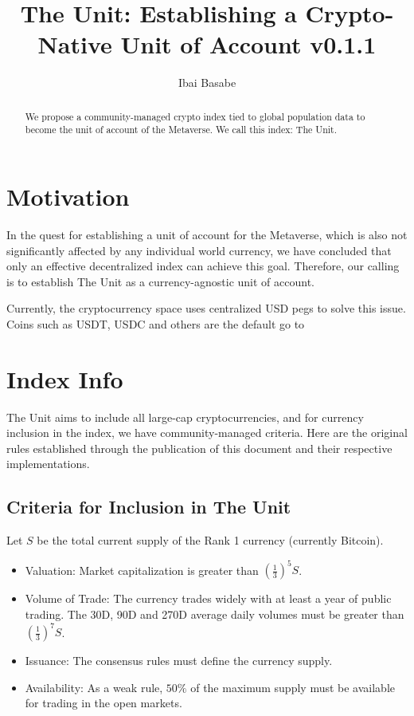 \documentclass[12pt]{article}
\title{The Unit: Establishing a Crypto-Native Unit of Account v0.1.1}
\author{Ibai Basabe}
\begin{document}
\pagecolor{yellow!15!}

\date{}

\maketitle


\begin{abstract}
We propose a community-managed crypto index tied to global population data to become the unit of account of the Metaverse. We call this index: The Unit. 
\end{abstract}


\tableofcontents
\newpage

\section{Motivation}

In the quest for establishing a unit of account for the Metaverse, which is also not significantly affected by any individual world currency, we have concluded that only an effective decentralized index can achieve this goal. Therefore, our calling is to establish The Unit as a currency-agnostic unit of account. 

Currently, the cryptocurrency space uses centralized USD pegs to solve this issue. Coins such as USDT, USDC and others are the default go to  

\section{Index Info}

The Unit aims to include all large-cap cryptocurrencies, and for currency inclusion in the index, we have community-managed criteria. Here are the original rules established through the publication of this document and their respective implementations.

\subsection{Criteria for Inclusion in The Unit}

Let $S$ be the total current supply of the Rank 1 currency (currently Bitcoin).

\begin{itemize}

\item Valuation: Market capitalization is greater than $\left(\frac{1}{3}\right)^5 S$.
\item Volume of Trade: The currency trades widely with at least a year of public trading. The 30D, 90D and 270D average daily volumes must be greater than $\left(\frac{1}{3}\right)^7 S$.
\item Issuance: The consensus rules must define the currency supply.
\item Availability: As a weak rule, $50\%$ of the maximum supply must be available for trading in the open markets.

\end{itemize}
\end{document}
